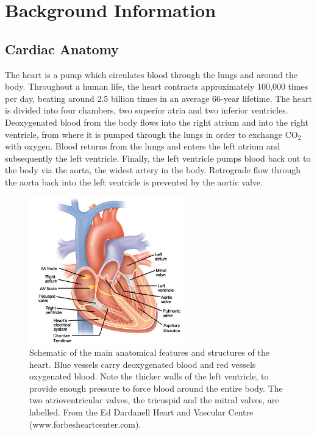 \chapter{Background Information}
\dblspace
\begin{quote}{\em }\end{quote}

\section{Cardiac Anatomy}
  The heart is a pump which circulates blood through the lungs and around the body. Throughout a human life, the heart contracts approximately 100,000 times per day, beating around 2.5 billion times in an average 66-year lifetime. The heart is divided into four chambers, two superior atria and two inferior ventricles. Deoxygenated blood from the body flows into the right atrium and into the right ventricle, from where it is pumped through the lungs in order to exchange CO$_2$ with oxygen. Blood returns from the lungs and enters the left atrium and subsequently the left ventricle. Finally, the left ventricle pumps blood back out to the body via the aorta, the widest artery in the body. Retrograde flow through the aorta back into the left ventricle is prevented by the aortic valve.
  
  \begin{figure}[htbp]
    \centering
    \includegraphics[width=0.6\textwidth]{Ch2/Figs/interior_heart_anatomy}
    \caption{Schematic of the main anatomical features and structures of the heart. Blue vessels carry deoxygenated blood and red vessels oxygenated blood. Note the thicker walls of the left ventricle, to provide enough pressure to force blood around the entire body. The two atrioventricular valves, the tricuspid and the mitral valves, are labelled. From the Ed Dardanell Heart and Vascular Centre (www.forbesheartcenter.com).}
    \label{fig:heart}
  \end{figure}  

